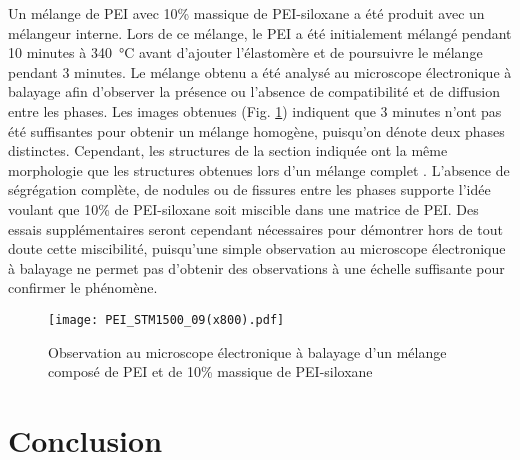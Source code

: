 Un mélange de PEI avec 10\% massique de PEI-siloxane a été produit avec un mélangeur interne. 
Lors de ce mélange, le PEI a été initialement mélangé pendant 10 minutes à \SI[locale=FR]{340}{\celsius} avant d'ajouter l'élastomère et de poursuivre le mélange pendant 3 minutes. 
Le mélange obtenu a été analysé au microscope électronique à balayage afin d'observer la présence ou l'absence de compatibilité et de diffusion entre les phases. 
Les images obtenues (Fig. \ref{fig:SEM_mix_STM1500_PEI}) indiquent que 3 minutes n'ont pas été suffisantes pour obtenir un mélange homogène, puisqu'on dénote deux phases distinctes. 
Cependant, les structures de la section indiquée ont la même morphologie que les structures obtenues lors d'un mélange complet \cite{Hatui2015}. 
L'absence de ségrégation complète, de nodules ou de fissures entre les phases supporte l'idée voulant que 10\% de PEI-siloxane soit miscible dans une matrice de PEI. 
Des essais supplémentaires seront cependant nécessaires pour démontrer hors de tout doute cette miscibilité, puisqu'une simple observation au microscope électronique à balayage ne permet pas d'obtenir des observations à une échelle suffisante pour confirmer le phénomène. 

\begin{figure}[h]
	\centering
	\texttt{[image: PEI\_STM1500\_09(x800).pdf]}
	\caption{Observation au microscope électronique à balayage d'un mélange composé de PEI et de 10\% massique de PEI-siloxane}
	\label{fig:SEM_mix_STM1500_PEI}
\end{figure}

\FloatBarrier
\section{Conclusion}

